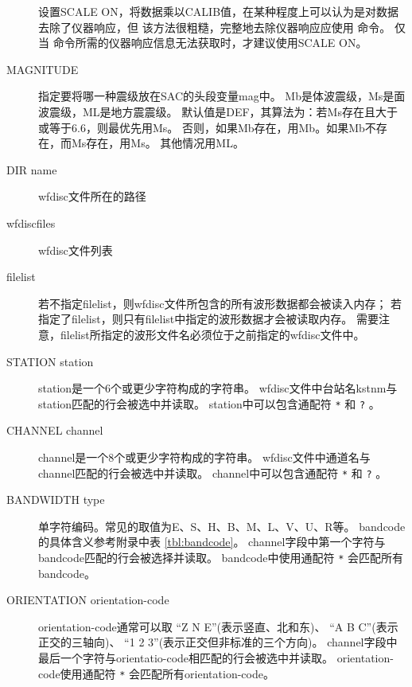 \begin{description}
    设置SCALE ON，将数据乘以CALIB值，在某种程度上可以认为是对数据去除了仪器响应，但
    该方法很粗糙，完整地去除仪器响应应使用  命令。
    仅当  命令所需的仪器响应信息无法获取时，才建议使用SCALE ON。
\item [MAGNITUDE] 指定要将哪一种震级放在SAC的头段变量mag中。
    Mb是体波震级，Ms是面波震级，ML是地方震震级。
    默认值是DEF，其算法为：若Ms存在且大于或等于6.6，则最优先用Ms。
    否则，如果Mb存在，用Mb。如果Mb不存在，而Ms存在，用Ms。
    其他情况用ML。
\item [DIR name] wfdisc文件所在的路径
\item [wfdiscfiles] wfdisc文件列表
\item [filelist] 若不指定filelist，则wfdisc文件所包含的所有波形数据都会被读入内存；
    若指定了filelist，则只有filelist中指定的波形数据才会被读取内存。
    需要注意，filelist所指定的波形文件名必须位于之前指定的wfdisc文件中。
\item[STATION station] station是一个6个或更少字符构成的字符串。
    wfdisc文件中台站名kstnm与station匹配的行会被选中并读取。
    station中可以包含通配符 \texttt{*} 和 \texttt{?} 。
\item[CHANNEL channel]  channel是一个8个或更少字符构成的字符串。
    wfdisc文件中通道名与channel匹配的行会被选中并读取。
    channel中可以包含通配符 \texttt{*} 和 \texttt{?} 。
\item [BANDWIDTH type] 单字符编码。常见的取值为E、S、H、B、M、L、V、U、R等。
    bandcode的具体含义参考附录中表 \ref{tbl:bandcode}。
    channel字段中第一个字符与bandcode匹配的行会被选择并读取。
    bandcode中使用通配符 \texttt{*} 会匹配所有bandcode。
\item [ORIENTATION orientation-code] orientation-code通常可以取
    ``Z N E''(表示竖直、北和东)、
    ``A B C''(表示正交的三轴向)、
    ``1 2 3''(表示正交但非标准的三个方向)。
    channel字段中最后一个字符与orientatio-code相匹配的行会被选中并读取。
    orientation-code使用通配符 \texttt{*} 会匹配所有orientation-code。
\end{description}

